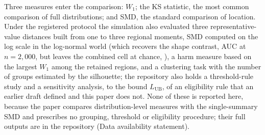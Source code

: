 \documentclass[AMA,Times1COL]{WileyNJDv5}
\begin{document}
Three measures enter the comparison: $W_1$; the KS statistic, the most common comparison of full distributions; and SMD, the standard comparison of location. Under the registered protocol the simulation also evaluated three representative-value distances built from one to three regional moments, SMD computed on the log scale in the log-normal world (which recovers the shape contrast, AUC  at $n = 2{,}000$, but leaves the combined cell at chance, ), a harm measure based on the largest $W_1$ among the retained regions, and a clustering task with the number of groups estimated by the silhouette; the repository also holds a threshold-rule study and a sensitivity analysis, to the bound $L_{\text{UB}}$, of an eligibility rule that an earlier draft defined and this paper does not. None of these is reported here, because the paper compares distribution-level measures with the single-summary SMD and prescribes no grouping, threshold or eligibility procedure; their full outputs are in the repository (Data availability statement).
\end{document}
